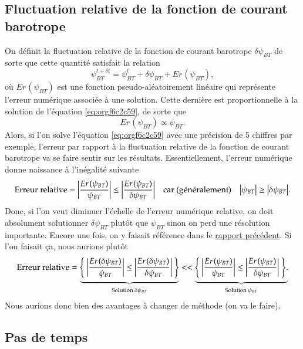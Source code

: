 \documentclass[10pt]{article}
\numberwithin{equation}{section}
\newcommand{\pt}{\hspace{1pt}}
\begin{document}
\subsection{Fluctuation relative de la fonction de courant barotrope}
\label{sec:orgbda9a54}
On définit la fluctuation relative de la fonction de courant barotrope \(\delta \psi_{BT}\) de sorte que cette quantité satisfait la relation
\begin{equation}
   \psi_{BT}^{t+\delta t} = \psi_{BT}^t + \delta \psi_{BT} + Er\pt(\psi_{BT}),
\end{equation}
où \(Er\pt(\psi_{BT})\) est une fonction pseudo-aléatoirement linéaire qui représente l'erreur numérique associée à une solution.
Cette dernière est proportionnelle à la solution de l'équation \ref{eq:orgf6c2c59}, de sorte que
\begin{equation}
    Er\pt(\psi_{BT}) \propto \psi_{BT}.
\end{equation}
Alors, si l'on solve l'équation \ref{eq:orgf6c2c59} avec une précision de 5 chiffres par exemple, l'erreur par rapport à la fluctuation relative de la fonction de courant barotrope va se faire sentir sur les résultats.
Essentiellement, l'erreur numérique donne naissance à l'inégalité suivante
\begin{align}
   &&\text{Erreur relative} = \abs{\frac{Er\pt(\psi_{BT})}{\psi_{BT}}} \le \abs{ \frac{Er\pt(\psi_{BT})}{\delta \psi_{BT}} } &&\text{car (généralement)} && \abs{\psi_{BT}} \ge \abs{\delta \psi_{BT}}. &&
\end{align}
Donc, si l'on veut diminuer l'échelle de l'erreur numérique relative, on doit absolument solutionner \(\delta \psi_{BT}\) plutôt que \(\psi_{BT}\) sinon on perd une résolution importante.
Encore une fois, on y faisait référence dans le \href{rapport-2023-04-28.org}{rapport précédent}.
Si l'on faisait ça, nous aurions plutôt
\begin{align}
   \text{Erreur relative} = \underbrace{\qty{\ \abs{\frac{Er\pt(\delta\psi_{BT})}{\psi_{BT}}} \le \abs{ \frac{Er\pt(\delta\psi_{BT})}{\delta \psi_{BT}} }\ }}_\text{Solution $\delta \psi_{BT}$}
   <<
   \underbrace{\qty{\ \abs{\frac{Er\pt(\psi_{BT})}{\psi_{BT}}} \le \abs{ \frac{Er\pt(\psi_{BT})}{\delta \psi_{BT}} }\ }.}_\text{Solution $\psi_{BT}$}
\end{align}
Nous aurions donc bien des avantages à changer de méthode (on va le faire).

\subsection{Pas de temps}
\label{sec:orgdf4cc36}
\end{document}
